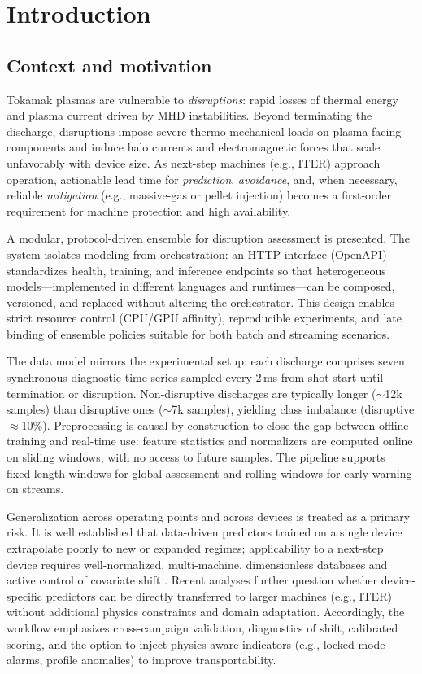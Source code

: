 \chapter{Introduction} \label{sec:cap1}

\section{Context and motivation}

Tokamak plasmas are vulnerable to \emph{disruptions}: rapid losses of thermal energy and plasma current driven by \ac{MHD} instabilities. Beyond terminating the discharge, disruptions impose severe thermo-mechanical loads on plasma-facing components and induce halo currents and electromagnetic forces that scale unfavorably with device size. As next-step machines (e.g., \ac{ITER}) approach operation, actionable lead time for \emph{prediction}, \emph{avoidance}, and, when necessary, reliable \emph{mitigation} (e.g., massive-gas or pellet injection) becomes a first-order requirement for machine protection and high availability.

A modular, protocol-driven ensemble for disruption assessment is presented. The system isolates modeling from orchestration: an HTTP interface (OpenAPI) standardizes health, training, and inference endpoints so that heterogeneous models---implemented in different languages and runtimes---can be composed, versioned, and replaced without altering the orchestrator. This design enables strict resource control (CPU/GPU affinity), reproducible experiments, and late binding of ensemble policies suitable for both batch and streaming scenarios.

The data model mirrors the experimental setup: each discharge comprises seven synchronous diagnostic time series sampled every 2\,ms from shot start until termination or disruption. Non-disruptive discharges are typically longer ($\sim$12k samples) than disruptive ones ($\sim$7k samples), yielding class imbalance (disruptive $\approx$10\%). Preprocessing is causal by construction to close the gap between offline training and real-time use: feature statistics and normalizers are computed online on sliding windows, with no access to future samples. The pipeline supports fixed-length windows for global assessment and rolling windows for early-warning on streams.

Generalization across operating points and across devices is treated as a primary risk. It is well established that data-driven predictors trained on a single device extrapolate poorly to new or expanded regimes; applicability to a next-step device requires well-normalized, multi-machine, dimensionless databases and active control of covariate shift \parencite[p.~S188]{henderChapter3MHD2007}. Recent analyses further question whether device-specific predictors can be directly transferred to larger machines (e.g., \ac{ITER}) without additional physics constraints and domain adaptation. Accordingly, the workflow emphasizes cross-campaign validation, diagnostics of shift, calibrated scoring, and the option to inject physics-aware indicators (e.g., locked-mode alarms, profile anomalies) to improve transportability.


